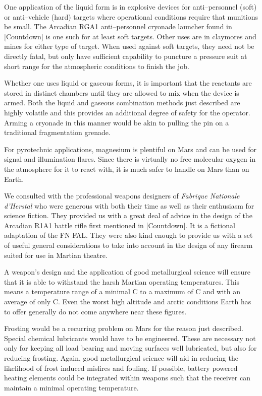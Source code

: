One application of the liquid form is in explosive devices for anti--personnel (soft) or anti--vehicle (hard) targets where operational conditions require that munitions be small. The Arcadian RGA1 anti--personnel cryonade launcher found in [Countdown] is one such for at least soft targets. Other uses are in claymores and mines for either type of target. When used against soft targets, they need not be directly fatal, but only have sufficient capability to puncture a pressure suit at short range for the atmospheric conditions to finish the job.

Whether one uses liquid or gaseous forms, it is important that the reactants are stored in distinct chambers until they are allowed to mix when the device is armed. Both the liquid and gaseous combination methods just described are highly volatile and this provides an additional degree of safety for the operator. Arming a cryonade in this manner would be akin to pulling the pin on a traditional fragmentation grenade.

For pyrotechnic applications, magnesium is plentiful on Mars and can be used for signal and illumination flares. Since there is virtually no free molecular oxygen in the atmosphere for it to react with, it is much safer to handle on Mars than on Earth.


We consulted with the professional weapons designers of {\it Fabrique Nationale d'Herstal} who were generous with both their time as well as their enthusiasm for science fiction. They provided us with a great deal of advice in the design of the Arcadian R1A1 battle rifle first mentioned in [Countdown]. It is a fictional adaptation of the FN FAL. They were also kind enough to provide us with a set of useful general considerations to take into account in the design of any firearm suited for use in Martian theatre.

A weapon's design and the application of good metallurgical science will ensure that it is able to withstand the harsh Martian operating temperatures. This means a temperature range of a minimal C to a maximum of C and with an average of only C. Even the worst high altitude and arctic conditions Earth has to offer generally do not come anywhere near these figures. 

Frosting would be a recurring problem on Mars for the reason just described. Special chemical lubricants would have to be engineered. These are necessary not only for keeping all load bearing and moving surfaces well lubricated, but also for reducing frosting. Again, good metallurgical science will aid in reducing the likelihood of frost induced misfires and fouling. If possible, battery powered heating elements could be integrated within weapons such that the receiver can maintain a minimal operating temperature.

